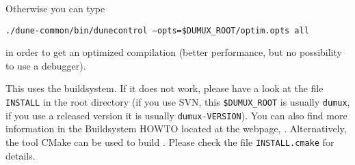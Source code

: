 Otherwise you can type
\begin{center}
\texttt{./dune-common/bin/dunecontrol --opts=\$DUMUX\_ROOT/optim.opts all}
\end{center}
in order to get an optimized compilation (better performance, but no possibility to use a debugger).

This uses the \Dune buildsystem. If it does not work, please have a look at the file \texttt{INSTALL} in the \Dumux root directory (if you use SVN, this \texttt{\$DUMUX\_ROOT} is usually \texttt{dumux}, if you use a released version it is usually \texttt{dumux-VERSION}). You can also find more information in the \Dune Buildsystem HOWTO located at the \Dune webpage, \cite{DUNE-HP}.  Alternatively, the tool CMake can be used to build \Dumux. Please check the file \texttt{INSTALL.cmake} for details.
